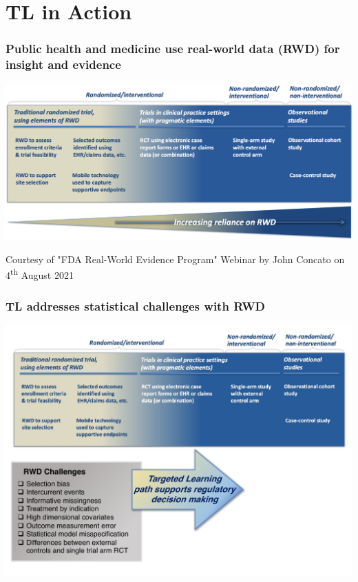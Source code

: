 \documentclass[t]{beamer}
\begin{document}
\section{TL in Action}

\begin{frame}
\frametitle{Public health and medicine use real-world data (RWD) for insight
  and evidence}
\vspace{20pt}
\begin{center}
\includegraphics[width=\textwidth]{figures/john_slide8_figure.png}
\end{center}
\vspace{35pt}
\tiny{Courtesy of "FDA Real-World Evidence Program" Webinar by John Concato on
  4\textsuperscript{th} August 2021}
\end{frame}

\begin{frame}
\frametitle{TL addresses statistical challenges with RWD}
\vspace{-18pt}
\begin{center}
\includegraphics[width=1.02\textwidth]{figures/TLpath1_edit.pdf}
\end{center}
\end{frame}
\end{document}
